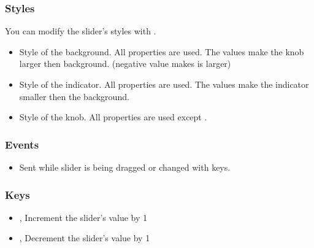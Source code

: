 \documentclass[letterpaper,10pt,english]{sphinxmanual}
\begin{document}
\subsubsection{Styles}
\label{\detokenize{object-types/slider:styles}}
You can modify the slider’s styles with .
\begin{itemize}
\item {} 
 Style of the background. All  properties are used. The  values make the knob larger then background. (negative value makes is larger)

\item {} 
 Style of the indicator. All  properties are used. The  values make the indicator smaller then the background.

\item {} 
 Style of the knob.  All  properties are used except .

\end{itemize}


\subsubsection{Events}
\label{\detokenize{object-types/slider:events}}\begin{itemize}
\item {} 
 Sent while slider is being dragged or changed with keys.

\end{itemize}


\subsubsection{Keys}
\label{\detokenize{object-types/slider:keys}}\begin{itemize}
\item {} 
,  Increment the slider’s value by 1

\item {} 
,  Decrement the slider’s value by 1

\end{itemize}
\end{document}
